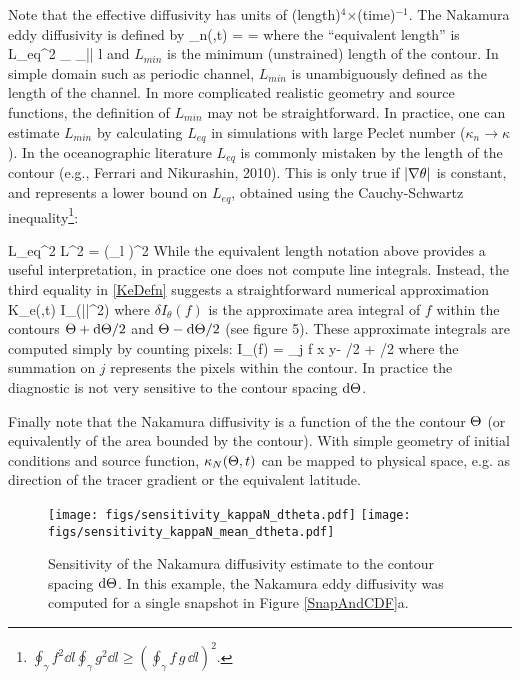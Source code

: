 \documentclass[11pt]{article}
\newcommand{\kappaN}{\kappa_{n}}
\begin{document}
Note that the effective diffusivity has units of (length)$^4$$\times$(time)$^{-1}$. The Nakamura eddy diffusivity is defined by
\beq
\label{knak}
\kappaN(\Th,t) =  = \kappa\com
\eeq
where the ``equivalent length'' is
\beq
\label{Leq}
L_{eq}^2  \oint_\gamma {} \oint_\gamma |\nabla \vth| \dd l \com
\eeq
and $L_{min}$ is the minimum  (unstrained) length of the contour. In simple domain such as periodic channel,
 $L_{min}$ is unambiguously defined as the length of the channel. In more complicated realistic geometry and source functions, the definition of $L_{min}$ may not be straightforward. In practice, one can estimate $L_{min}$ by calculating $L_{eq}$ in simulations with large Peclet number ($\kappaN \to \kappa$). 
In the oceanographic literature  $L_{eq}$ is commonly mistaken by the length of the contour (e.g., Ferrari and Nikurashin, 2010). This is only true if $|\nabla \theta |$ is constant, and represents a lower bound on $L_{eq}$, obtained using the Cauchy-Schwartz inequality\footnote{$\oint_\gamma f^2 \dd l \oint_\gamma g^2 \dd l \ge \left(\oint_\gamma f\,g \,\dd l\right)^2.$}:

\beq
L_{eq}^2 \ge L^2 = \Big(\oint_\gamma \dd l \Big)^2\per
\eeq
While the equivalent length notation above provides a useful interpretation, in practice  one does not compute
line integrals. Instead, the third equality in \eqref{KeDefn} suggests a straightforward numerical approximation
\beq
K_e(\Th,t) \approx {} \delta I_\Th(\kappa |\nabla \vth|^2) \com 
\eeq
where $\delta I_\theta(f)$ is the approximate area integral of $f$ within the contours $\Theta + {\rm d} \Theta/2$ and $\Theta - {\rm d} \Theta/2$ (see figure 5). These approximate integrals are computed simply by counting pixels:
\beq
\delta I_\Th(f) = \sum_j f \dd x \dd y\com \qquad \Th - \dd \Th/2 \leq \vth \leq \Th + \dd \Th/2 \com
\eeq
 where the summation on $j$ represents the pixels within the contour. In practice the diagnostic is not very sensitive to the 
 contour spacing ${\rm d} \Theta$.
 
 Finally note that the Nakamura diffusivity is a function of the the contour $\Theta$ (or equivalently of the area bounded by the contour). With simple geometry of initial conditions and source function, $\kappa_N(\Theta,t)$  can be mapped to physical space, e.g. as direction of the tracer gradient or the equivalent latitude. 
  
  
 \begin{figure}[ht]
    \centering
    \texttt{[image: figs/sensitivity\_kappaN\_dtheta.pdf]}
        \texttt{[image: figs/sensitivity\_kappaN\_mean\_dtheta.pdf]}\\
    \caption{\small Sensitivity of the Nakamura diffusivity estimate to the contour spacing ${\rm d} \Theta$. In this example, the Nakamura eddy diffusivity was computed for a single snapshot in Figure \ref{SnapAndCDF}a.}
        \label{SensitivitykNdTh}
\end{figure}
  
\end{document}
